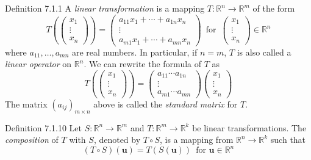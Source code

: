 \documentclass[10pt,landscape]{article}
\newcommand{\vect}[1]{\bm{#1}}
\theoremstyle{definition}
\newcommand{\thistheoremname}{}
\newtheorem*{genericthm*}{\thistheoremname}
\newenvironment{namedthm*}[1]
{\renewcommand{\thistheoremname}{#1}\begin{genericthm*}}
{\end{genericthm*}}
\begin{document}
\begin{multicols}{3}
\begin{namedthm*}{Definition 7.1.1}
    A \textit{linear transformation} is a mapping \(T : \mathbb{R}^n \to \mathbb{R}^m\) of the form
    \[
        T\left(
            \begin{pmatrix}
                x_1\\ 
                \vdots\\ 
                x_n
            \end{pmatrix}
        \right) = 
            \begin{pmatrix} 
                a_{11}x_1 + \cdots + a_{1n}x_n\\
                \vdots\\
                a_{m1}x_1 + \cdots + a_{mn}x_n
            \end{pmatrix}
        \enspace\text{for}\enspace\begin{pmatrix}x_1\\ \vdots \\ x_n\end{pmatrix} \in \mathbb{R}^n
    \]
    where \(a_{11}, \dots, a_{mn}\) are real numbers. In particular, if \(n = m\), \(T\) is also called a \textit{linear operator} on \(\mathbb{R}^n\). We can rewrite the formula of \(T\) as
    \[
        T\left(
            \begin{pmatrix}
                x_1\\ 
                \vdots\\ 
                x_n
            \end{pmatrix}
        \right) = 
            \begin{pmatrix} 
                a_{11} \cdots a_{1n}\\
                \vdots\\
                a_{m1} \cdots a_{mn}
            \end{pmatrix}
            \begin{pmatrix}
                x_1\\
                \vdots\\
                x_n
            \end{pmatrix}
    \]
    The matrix \(\left(a_{ij}\right)_{m \times n}\) above is called the \textit{standard matrix} for \(T\).
\end{namedthm*}

\begin{namedthm*}{Definition 7.1.10}
    Let \(S: \mathbb{R}^n \to \mathbb{R}^m\) and \(T : \mathbb{R}^m \to \mathbb{R}^k\) be linear transformations. The \textit{composition} of \(T\) with \(S\), denoted by \(T \circ S\), is a mapping from \(\mathbb{R}^n \to \mathbb{R}^k\) such that
    \[
        (T \circ S)(\vect{u}) = T(S(\vect{u}))\enspace\text{for \(\vect{u} \in \mathbb{R}^n\)}
    \]
\end{namedthm*}


\end{multicols}
\end{document}
